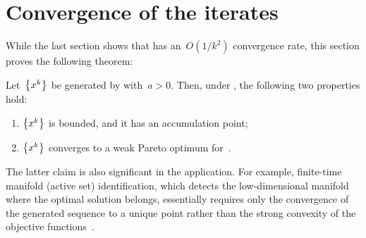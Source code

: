 \documentclass[../main]{subfiles}
\begin{document}
\section{Convergence of the iterates} 
While the last section shows that  has an~$O(1 / k^2)$ convergence rate, this section proves the following theorem:
\begin{theorem} 
    Let~$\set*{x^k}$ be generated by  with~$a > 0$.
    Then, under , the following two properties hold:
    \begin{enumerate}
        \item {} $\set*{x^k}$ is bounded, and it has an accumulation point;
        \item {} $\set*{x^k}$ converges to a weak Pareto optimum for~.
    \end{enumerate}
\end{theorem}
The latter claim is also significant in the application.
For example, finite-time manifold (active set) identification, which detects the low-dimensional manifold where the optimal solution belongs, essentially requires only the convergence of the generated sequence to a unique point rather than the strong convexity of the objective functions~\cite{Sun2019}.
\end{document}
